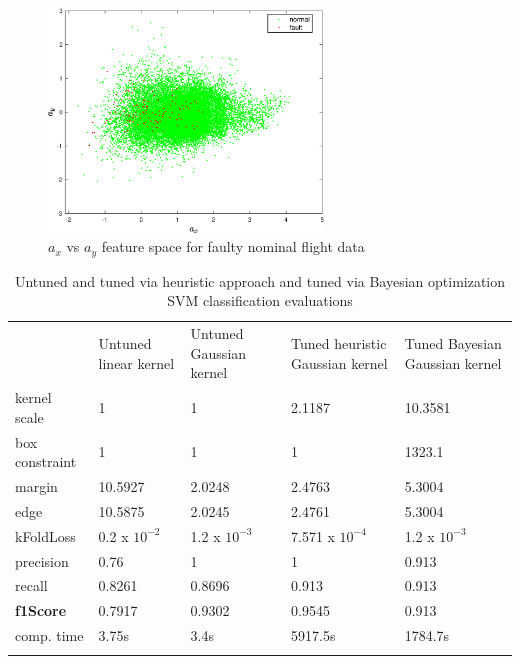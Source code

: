 \begin{figure}[H]
\begin{center}
\includegraphics[width=0.65\textwidth]{figures/feat1vsfeat2FaultStuck}    %
\caption{$a_x$ vs $a_y$ feature space for faulty nominal flight data} 
\label{fig:feat1vsfeat2FaultStuck}
\end{center}
\end{figure}



\begin{table}[!ht]
	\centering
\caption{Untuned and tuned via heuristic approach and tuned via Bayesian optimization SVM classification evaluations}
\label{tab:stuck}       %
\begin{tabular}{p{2.7cm}p{2.0cm}p{2.3cm}p{3cm}p{3cm}}
\hline\noalign{\smallskip}
 & Untuned linear kernel & Untuned Gaussian kernel & Tuned heuristic Gaussian kernel & Tuned Bayesian Gaussian kernel\\
\noalign{\smallskip}\hline\noalign{\smallskip}
kernel scale & 1 & 1 & 2.1187 & 10.3581 \\
box constraint & 1 & 1 & 1 & 1323.1 \\
margin & 10.5927 & 2.0248 & 2.4763 & 5.3004 \\
edge & 10.5875 & 2.0245 & 2.4761 & 5.3004 \\
kFoldLoss & 0.2 x $10^{-2}$ & 1.2 x $10^{-3}$& 7.571 x $10^{-4}$ & 1.2 x $10^{-3}$ \\
precision & 0.76 & 1 & 1 & 0.913 \\
recall & 0.8261 & 0.8696 & 0.913 & 0.913\\
\textbf{f1Score} & 0.7917 & 0.9302 &0.9545 & 0.913 \\
comp. time & 3.75s & 3.4s & 5917.5s & 1784.7s \\
\noalign{\smallskip}\hline
\end{tabular}
\end{table}

